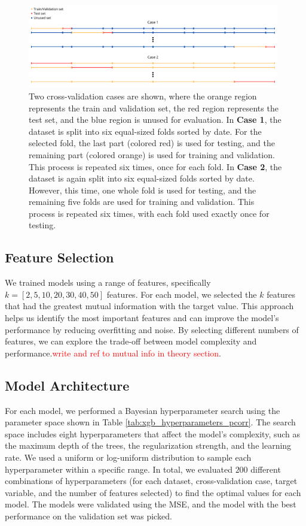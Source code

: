 \begin{figure}[H]
    \centering
    \includegraphics[width=0.98\textwidth]{Canva/datasplits.png}
    \caption{Two cross-validation cases are shown, where the orange region represents the train and validation set, the red region represents the test set, and the blue region is unused for evaluation.
    In \textbf{Case 1}, the dataset is split into six equal-sized folds sorted by date.
    For the selected fold, the last part (colored red) is used for testing, and the remaining part (colored orange) is used for training and validation.
    This process is repeated six times, once for each fold.
    In \textbf{Case 2}, the dataset is again split into six equal-sized folds sorted by date.
    However, this time, one whole fold is used for testing, and the remaining five folds are used for training and validation.
    This process is repeated six times, with each fold used exactly once for testing.}
    \label{fig:datasplit_cases}
\end{figure}




\subsection{Feature Selection}
We trained models using a range of features, specifically $k=[2,5,10,20,30,40,50]$ features.
For each model, we selected the $k$ features that had the greatest mutual information with the target value.
This approach helps us identify the most important features and can improve the model's performance by reducing overfitting and noise.
By selecting different numbers of features, we can explore the trade-off between model complexity and performance.\textcolor{red}{write and ref to mutual info in theory section}.

\subsection{Model Architecture}
For each model, we performed a Bayesian hyperparameter search using the parameter space shown in Table \ref{tab:xgb_hyperparameters_pcorr}.
The search space includes eight hyperparameters that affect the model's complexity, such as the maximum depth of the trees, the regularization strength, and the learning rate.
We used a uniform or log-uniform distribution to sample each hyperparameter within a specific range.
In total, we evaluated $200$ different combinations of hyperparameters (for each dataset, cross-validation case, target variable, and the number of features selected) to find the optimal values for each model.
The models were validated using the MSE, and the model with the best performance on the validation set was picked.


